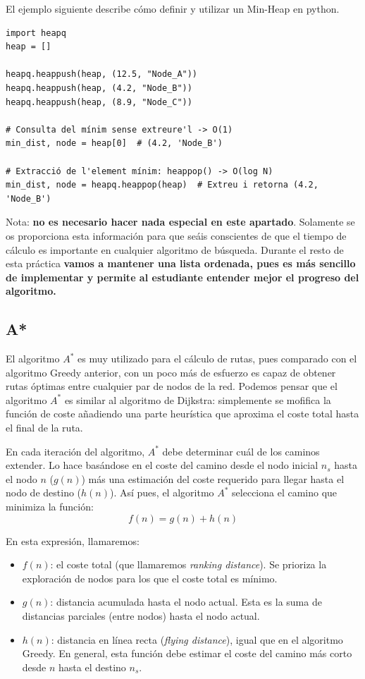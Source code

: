 \documentclass{article}
\begin{document}
El ejemplo siguiente describe cómo definir y utilizar un Min-Heap en python.
\begin{verbatim}
import heapq
heap = []

heapq.heappush(heap, (12.5, "Node_A"))
heapq.heappush(heap, (4.2, "Node_B"))
heapq.heappush(heap, (8.9, "Node_C"))

# Consulta del mínim sense extreure'l -> O(1)
min_dist, node = heap[0]  # (4.2, 'Node_B')

# Extracció de l'element mínim: heappop() -> O(log N)
min_dist, node = heapq.heappop(heap)  # Extreu i retorna (4.2, 'Node_B')    
\end{verbatim}
    
Nota: \textbf{no es necesario hacer nada especial en este apartado}. Solamente se os proporciona esta información para que seáis conscientes de que el tiempo de cálculo es importante en cualquier algoritmo de búsqueda. Durante el resto de esta práctica  \textbf{vamos a mantener una lista ordenada, pues es más sencillo de implementar y permite al estudiante entender mejor el progreso del algoritmo.}


\subsection{A*}
El algoritmo $A^*$ es muy utilizado para el cálculo de rutas, pues comparado con el algoritmo Greedy anterior, con un poco más de esfuerzo es capaz de obtener rutas óptimas entre cualquier par de nodos de la red. Podemos pensar que el algoritmo $A^*$ es similar al algoritmo de Dijkstra: simplemente se mofifica la función de coste añadiendo una parte heurística que aproxima el coste total hasta el final de la ruta.

En cada iteración del algoritmo, $A^*$ debe determinar cuál de los caminos extender. Lo hace basándose en el coste del camino desde el nodo inicial $n_s$ hasta el nodo $n$ ($g(n)$) más una estimación del coste requerido para llegar hasta el nodo de destino ($h(n)$). Así pues, el algoritmo $A^*$ selecciona el camino que minimiza la función:
\begin{equation*}
    f(n) = g(n) + h(n)
\end{equation*}

En esta expresión, llamaremos:
\begin{itemize}
    \item $f(n)$: el coste total (que llamaremos \textit{ranking distance}). Se prioriza la exploración de nodos para los que el coste total es mínimo.
    \item $g(n)$: distancia acumulada hasta el nodo actual. Esta es la suma de distancias parciales (entre nodos) hasta el nodo actual.
    \item $h(n)$: distancia en línea recta (\textit{flying distance}), igual que en el algoritmo Greedy. En general, esta función debe estimar el coste del camino más corto desde $n$ hasta el destino $n_s$.
\end{itemize}
\end{document}
